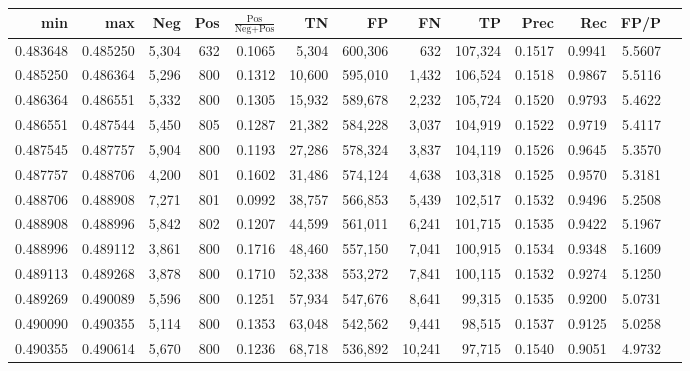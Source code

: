 \begin{tabular}{rrrrrrrrrrrrr}
\toprule
     min &      max &   Neg & Pos & $\frac{\text{Pos}}{\text{Neg}+\text{Pos}}$ &      TN &      FP &      FN &      TP &   Prec &    Rec &   FP/P \\
\midrule
0.483648 & 0.485250 & 5,304 & 632 &                                     0.1065 &   5,304 & 600,306 &     632 & 107,324 & 0.1517 & 0.9941 & 5.5607 \\
0.485250 & 0.486364 & 5,296 & 800 &                                     0.1312 &  10,600 & 595,010 &   1,432 & 106,524 & 0.1518 & 0.9867 & 5.5116 \\
0.486364 & 0.486551 & 5,332 & 800 &                                     0.1305 &  15,932 & 589,678 &   2,232 & 105,724 & 0.1520 & 0.9793 & 5.4622 \\
0.486551 & 0.487544 & 5,450 & 805 &                                     0.1287 &  21,382 & 584,228 &   3,037 & 104,919 & 0.1522 & 0.9719 & 5.4117 \\
0.487545 & 0.487757 & 5,904 & 800 &                                     0.1193 &  27,286 & 578,324 &   3,837 & 104,119 & 0.1526 & 0.9645 & 5.3570 \\
0.487757 & 0.488706 & 4,200 & 801 &                                     0.1602 &  31,486 & 574,124 &   4,638 & 103,318 & 0.1525 & 0.9570 & 5.3181 \\
0.488706 & 0.488908 & 7,271 & 801 &                                     0.0992 &  38,757 & 566,853 &   5,439 & 102,517 & 0.1532 & 0.9496 & 5.2508 \\
0.488908 & 0.488996 & 5,842 & 802 &                                     0.1207 &  44,599 & 561,011 &   6,241 & 101,715 & 0.1535 & 0.9422 & 5.1967 \\
0.488996 & 0.489112 & 3,861 & 800 &                                     0.1716 &  48,460 & 557,150 &   7,041 & 100,915 & 0.1534 & 0.9348 & 5.1609 \\
0.489113 & 0.489268 & 3,878 & 800 &                                     0.1710 &  52,338 & 553,272 &   7,841 & 100,115 & 0.1532 & 0.9274 & 5.1250 \\
0.489269 & 0.490089 & 5,596 & 800 &                                     0.1251 &  57,934 & 547,676 &   8,641 &  99,315 & 0.1535 & 0.9200 & 5.0731 \\
0.490090 & 0.490355 & 5,114 & 800 &                                     0.1353 &  63,048 & 542,562 &   9,441 &  98,515 & 0.1537 & 0.9125 & 5.0258 \\
0.490355 & 0.490614 & 5,670 & 800 &                                     0.1236 &  68,718 & 536,892 &  10,241 &  97,715 & 0.1540 & 0.9051 & 4.9732 \\

\end{tabular}
